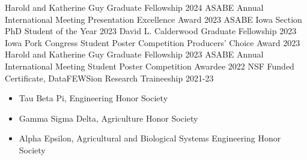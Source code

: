 



\begin{cvhonors}

 \cvhonor
    { } %
    {Harold and Katherine Guy Graduate Fellowship} %
    { } %
    {2024} %
 \cvhonor
    { } %
    {ASABE Annual International Meeting Presentation Excellence Award} %
    { } %
    {2023} %
  \cvhonor
    { } %
    {ASABE Iowa Section PhD Student of the Year} %
    { } %
    {2023} %
  \cvhonor
    { } %
    {David L. Calderwood Graduate Fellowship} %
    { } %
    {2023} %
  \cvhonor
    { } %
    {Iowa Pork Congress Student Poster Competition Producers' Choice Award} %
    { } %
    {2023} %
  \cvhonor
    { } %
    {Harold and Katherine Guy Graduate Fellowship} %
    { } %
    {2023} %
  \cvhonor
    { } %
    {ASABE Annual International Meeting Student Poster Competition Awardee} %
    { } %
    {2022} %
  \cvhonor
    {} %
    {NSF Funded Certificate, DataFEWSion Research Traineeship} %
    { } %
    {2021-23} %

\end{cvhonors}


\begin{cvparagraph}
\begin{itemize}
\item Tau Beta Pi, Engineering Honor Society 

\item Gamma Sigma Delta, Agriculture Honor Society 
    
\item Alpha Epsilon, Agricultural and Biological Systems Engineering Honor Society 
\end{itemize}

\end{cvparagraph}